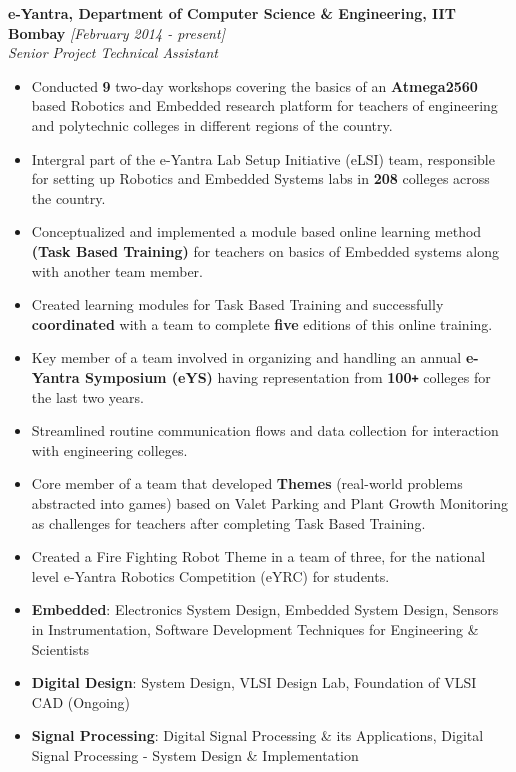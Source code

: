 \documentclass{article}
\def\Plus{\texttt{+}}
\begin{document}
\vspace{2mm}\textbf{e-Yantra, Department of Computer Science \& Engineering, IIT Bombay} \hfill\textit{[February 2014 - present]}\\
\textit{Senior Project Technical Assistant}
\vspace{-2mm}
\begin{itemize}[leftmargin=3.5mm]
	\setlength{\itemsep}{-0.7mm}
	\item Conducted \textbf{9} two-day workshops covering the basics of an \textbf{Atmega2560} based Robotics and Embedded research platform for teachers of engineering and polytechnic colleges in different regions of the country. 
	\item Intergral part of the e-Yantra Lab Setup Initiative (eLSI) team, responsible for setting up Robotics and Embedded Systems labs in \textbf{208} colleges across the country.
	\item Conceptualized and implemented a module based online learning method \textbf{(Task Based Training)} for teachers on basics of Embedded systems along with another team member. 
	\item Created learning modules for Task Based Training and successfully \textbf{coordinated} with a team to complete \textbf{five} editions of this online training.
	\item Key member of a team involved in organizing and handling an annual \textbf{e-Yantra Symposium (eYS)}  having representation from \textbf{100\Plus} colleges for the last two years.
	\item Streamlined routine communication flows and data collection for interaction with engineering colleges. 
	\item Core member of a team that developed \textbf{Themes} (real-world problems abstracted into games) based on Valet Parking and Plant Growth Monitoring as challenges for teachers after completing Task Based Training. 
	\item Created a Fire Fighting Robot Theme in a team of three, for the national level e-Yantra Robotics Competition (eYRC) for students.
\end{itemize}
\underline{}
\vspace{-5mm}
\begin{itemize}[leftmargin=3.5mm]
	\vspace{-0.5mm}
	\setlength{\itemsep}{1mm}
	\item \textbf{Embedded}: Electronics System Design, Embedded System Design, Sensors in Instrumentation, Software Development Techniques for Engineering \& Scientists
	\vspace{-2mm}
	\item\textbf{Digital Design}: System Design, VLSI Design Lab, Foundation of VLSI CAD (Ongoing)
	\vspace{-2mm}
	\item \textbf{Signal Processing}: Digital Signal Processing \& its Applications, Digital Signal Processing - System Design \& Implementation 
\end{itemize}
\underline{}
\end{document}
